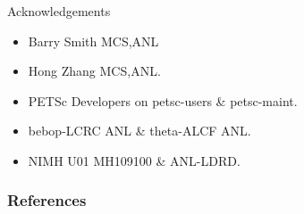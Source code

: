 \documentclass{beamer}
\begin{document}
\begin{frame}{Acknowledgements}
  \begin{itemize}
  \item \alert{Barry Smith} MCS,ANL
  \item \alert{Hong Zhang} MCS,ANL.
  \item \alert{PETSc Developers} on petsc-users \& petsc-maint.
  \item \alert{bebop-LCRC} ANL \& \alert{theta-ALCF} ANL.
  \item \alert{NIMH} U01 MH109100 \& \alert{ANL-LDRD}.
  \end{itemize}
\end{frame}


\renewcommand*{\bibfont}{\scriptsize}
\begin{frame}[t, allowframebreaks]
\frametitle{References}


\end{frame}
\end{document}
